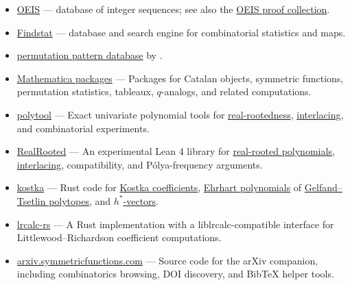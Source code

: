 \begin{itemize}
\item {} \href{https://oeis.org/}{OEIS} --- database of integer
sequences; see also the \hyperref[oeisProofs]{OEIS proof collection}.

\item {} \href{https://www.findstat.org/}{Findstat} --- database and search engine for combinatorial statistics and maps.

\item {} \href{https://math.depaul.edu/~bridget/patterns.html}{permutation pattern database} by .

\item {} \href{https://github.com/PerAlexandersson/Mathematica-packages}{Mathematica packages} ---
Packages for Catalan objects, symmetric functions, permutation statistics,
tableaux, \(q\)-analogs, and related computations.

\item {} \href{https://github.com/PerAlexandersson/polytool}{polytool} ---
Exact univariate polynomial tools for
\hyperref[realRootedPolynomial]{real-rootedness},
\hyperref[interlacingPolynomials]{interlacing}, and combinatorial experiments.

\item {} \href{https://github.com/PerAlexandersson/RealRooted}{RealRooted} ---
An experimental Lean 4 library for
\hyperref[realRootedPolynomial]{real-rooted polynomials},
\hyperref[interlacingPolynomials]{interlacing}, compatibility, and
Pólya-frequency arguments.

\item {} \href{https://github.com/PerAlexandersson/kostka}{kostka} ---
Rust code for \hyperref[kostkaCoefficient]{Kostka coefficients},
\hyperref[ehrhartPolynomialDefinition]{Ehrhart polynomials} of
\hyperref[gtPolytope]{Gelfand--Tsetlin polytopes}, and
\hyperref[hStarVector]{\(h^*\)-vectors}.

\item {} \href{https://github.com/PerAlexandersson/lrcalc-rs}{lrcalc-rs} ---
A Rust implementation with a liblrcalc-compatible interface for
Littlewood--Richardson coefficient computations.

\item {} \href{https://github.com/PerAlexandersson/arxiv.symmetricfunctions.com}{arxiv.symmetricfunctions.com} ---
Source code for the arXiv companion, including combinatorics browsing,
DOI discovery, and BibTeX helper tools.
\end{itemize}
